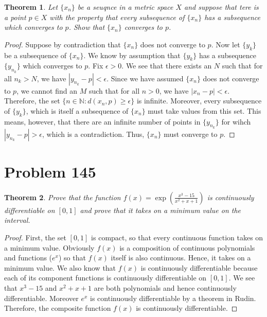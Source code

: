 \documentclass[psamsfonts]{amsart}
\newtheorem{thm}{Theorem}[section]
\theoremstyle{definition}
\theoremstyle{remark}
\numberwithin{equation}{section}
\begin{document}
\begin{thm}
Let $\{ x_n \}$ be a seuqnce in a metric space $X$ and suppose that tere is a point $p \in X$ with the property that every subsequence of $\{ x_n \}$ has a subsequence which converges to $p$. Show that $\{ x_n \}$ converges to $p$. 
\end{thm}

\begin{proof}
Suppose by contradiction that $\{ x_n \}$ does not converge to $p$. Now let $\{ y_k \}$ be a subsequence of $\{ x_n \}$. We know by assumption that $\{ y_k \}$ has a subsequence $\{ y_{n_k} \}$ which converges to $p$. Fix $\epsilon > 0$. We see that there exists an $N$ such that for all $n_k > N$, we have $|y_{n_k} - p | < \epsilon$. Since we have assumed $\{ x_n \}$ does not converge to $p$, we cannot find an $M$ such that for all $n > 0$, we have $|x_n - p | < \epsilon$. Therefore, the set $\{ n \in \mathbb{N}: d(x_n, p) \geq \epsilon \}$ is infinite. Moreover, every subsequence of $\{ y_k \}$, which is itself a subsequence of $\{x_n \}$ must take values from this set. This means, however, that there are an infinite number of points in $\{y_{n_k}\}$ for wihch $|y_{n_k} - p | > \epsilon$, which is a contradiction. Thus, $\{ x_n \}$ must converge to $p$. 
\end{proof}

\section{Problem 145}

\begin{thm}
Prove that the function $f(x) = \exp( \frac{x^3 - 15}{x^2 + x + 1} ) $ is continuously differentiable on $[0,1]$ and prove that it takes on a minimum value on the interval.
\end{thm}

\begin{proof}
First, the set $[0,1]$ is compact, so that every continuous function takes on a minimum value. Obviously $f(x)$ is a composition of continuous polynomials and functions ($e^x$) so that $f(x)$ itself is also continuous. Hence, it takes on a minimum value. We also know that $f(x)$ is continuously differentiable because each of its component functions is continuously differentiable on $[0,1]$. We see that $x^3 - 15$ and $x^2 + x + 1$ are both polynomials and hence continuously differentiable. Moreover $e^x$ is continuously differentiable by a theorem in Rudin. Therefore, the composite function $f(x)$ is continuously differentiable. 
\end{proof}
\end{document}
